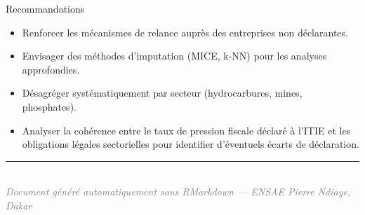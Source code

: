 \documentclass[
  12pt,
]{article}
\begin{document}
\begin{boiteex}{Recommandations}
\begin{itemize}
  \item Renforcer les mécanismes de relance auprès des entreprises non déclarantes.
  \item Envisager des méthodes d'imputation (MICE, k-NN) pour les analyses approfondies.
  \item Désagréger systématiquement par secteur (hydrocarbures, mines, phosphates).
  \item Analyser la cohérence entre le taux de pression fiscale déclaré à l'ITIE et les obligations légales sectorielles pour identifier d'éventuels écarts de déclaration.
\end{itemize}
\end{boiteex}

\vfill

\begin{center}
\textcolor{MidnightBlue}{\rule{0.6\linewidth}{1.5pt}}\\[6pt]
\textit{\textcolor{gray}{Document généré automatiquement sous RMarkdown --- ENSAE Pierre Ndiaye, Dakar}}
\end{center}
\end{document}
